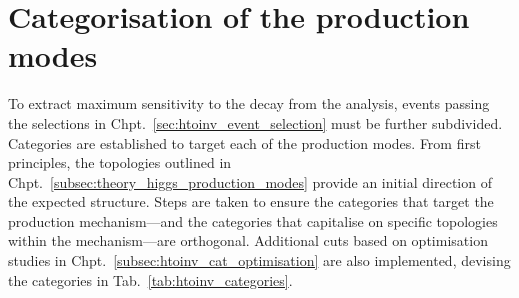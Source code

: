 \section{Categorisation of the production modes}
\label{sec:htoinv_categorisation}

To extract maximum sensitivity to the \higgstoinv decay from the analysis, events passing the selections in Chpt.~\ref{sec:htoinv_event_selection} must be further subdivided. Categories are established to target each of the production modes. From first principles, the topologies outlined in Chpt.~\ref{subsec:theory_higgs_production_modes} provide an initial direction of the expected structure. Steps are taken to ensure the categories that target the production mechanism---and the categories that capitalise on specific topologies within the mechanism---are orthogonal. Additional cuts based on optimisation studies in Chpt.~\ref{subsec:htoinv_cat_optimisation} are also implemented, devising the categories in Tab.~\ref{tab:htoinv_categories}.

